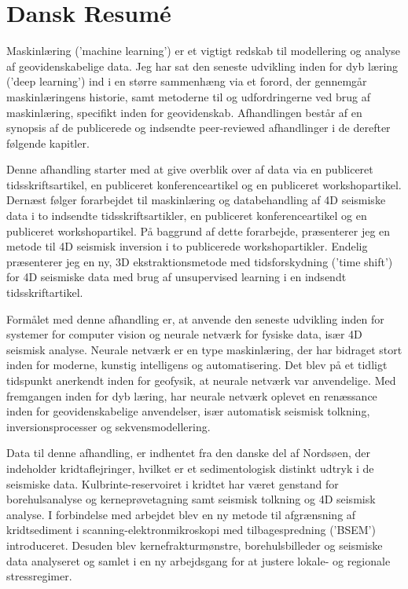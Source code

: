 \chapter{Dansk Resum\'e}
Maskinl{\ae}ring (’machine learning’) er et vigtigt redskab til modellering og analyse af geovidenskabelige data. Jeg har sat den seneste udvikling inden for dyb l{\ae}ring (’deep learning’) ind i en st{\o}rre sammenh{\ae}ng via et forord, der gennemg{\aa}r maskinl{\ae}ringens historie, samt metoderne til og udfordringerne ved brug af maskinl{\ae}ring, specifikt inden for geovidenskab. Afhandlingen best{\aa}r af en synopsis af de publicerede og indsendte peer-reviewed afhandlinger i de derefter f{\o}lgende kapitler. 

Denne afhandling starter med at give overblik over af data via en publiceret tidsskriftsartikel, en publiceret konferenceartikel og en publiceret workshopartikel. Dern{\ae}st f{\o}lger forarbejdet til maskinl{\ae}ring og databehandling af 4D seismiske data i to indsendte tidsskriftsartikler, en publiceret konferenceartikel og en publiceret workshopartikel. P{\aa} baggrund af dette forarbejde, pr{\ae}senterer jeg en metode til 4D seismisk inversion i to publicerede workshopartikler. Endelig pr{\ae}senterer jeg en ny, 3D ekstraktionsmetode med tidsforskydning (’time shift’) for 4D seismiske data med brug af unsupervised learning i en indsendt tidsskriftartikel. 

Form{\aa}let med denne afhandling er, at anvende den seneste udvikling inden for systemer for computer vision og neurale netv{\ae}rk for fysiske data, is{\ae}r 4D seismisk analyse. Neurale netv{\ae}rk er en type maskinl{\ae}ring, der har bidraget stort inden for moderne, kunstig intelligens og automatisering. Det blev p{\aa} et tidligt tidspunkt anerkendt inden for geofysik, at neurale netv{\ae}rk var anvendelige. Med fremgangen inden for dyb l{\ae}ring, har neurale netv{\ae}rk oplevet en ren{\ae}ssance inden for geovidenskabelige anvendelser, is{\ae}r automatisk seismisk tolkning, inversionsprocesser og sekvensmodellering.

Data til denne afhandling, er indhentet fra den danske del af Nords{\o}en, der indeholder kridtaflejringer, hvilket er et sedimentologisk distinkt udtryk i de seismiske data. Kulbrinte-reservoiret i kridtet har v{\ae}ret genstand for borehulsanalyse og kernepr{\o}vetagning samt seismisk tolkning og 4D seismisk analyse. I forbindelse med arbejdet blev en ny metode til afgr{\ae}nsning af kridtsediment i scanning-elektronmikroskopi med tilbagespredning (’BSEM’) introduceret. Desuden blev kernefrakturm{\o}nstre, borehulsbilleder og seismiske data analyseret og samlet i en ny arbejdsgang for at justere lokale- og regionale stressregimer.

